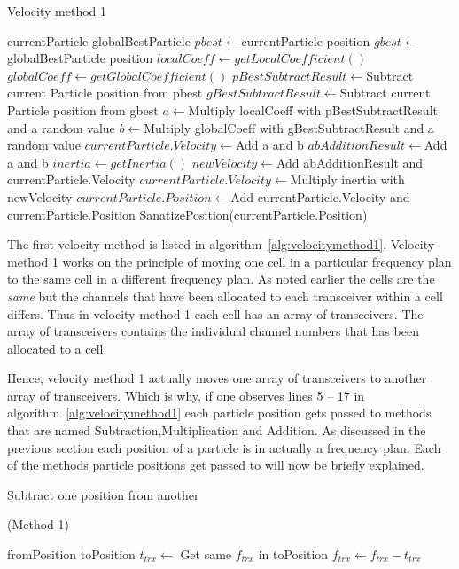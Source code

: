 \begin{algorithm}
\caption{Velocity method 1}
\label{alg:velocitymethod1}
	\begin{algorithmic}[1]
	\REQUIRE currentParticle
	\REQUIRE globalBestParticle
	\STATE $pbest \leftarrow $currentParticle position
	\STATE $gbest \leftarrow $globalBestParticle position
	\STATE $localCoeff \leftarrow getLocalCoefficient()$
	\STATE $globalCoeff \leftarrow getGlobalCoefficient()$
	\STATE $pBestSubtractResult \leftarrow $Subtract current Particle position from pbest
	\STATE $gBestSubtractResult \leftarrow $Subtract current Particle position from gbest
	\STATE $a \leftarrow $Multiply localCoeff with pBestSubtractResult and a random value
	\STATE $b \leftarrow $Multiply globalCoeff with gBestSubtractResult and a random value
		\STATE $currentParticle.Velocity \leftarrow $Add a and b
	\ELSE
		\STATE $abAdditionResult \leftarrow $Add a and b
		\STATE $inertia \leftarrow getInertia()$
		\STATE $newVelocity \leftarrow $Add abAdditionResult and currentParticle.Velocity
		\STATE $currentParticle.Velocity \leftarrow $Multiply inertia with newVelocity
	\ENDIF
	\STATE $currentParticle.Position \leftarrow $Add currentParticle.Velocity and currentParticle.Position
	\STATE SanatizePosition(currentParticle.Position)
	\end{algorithmic}
\end{algorithm}

The first velocity method is listed in algorithm~\ref{alg:velocitymethod1}. Velocity method 1 works on the principle of moving one cell in a particular frequency plan to the same cell in a different frequency plan. As noted earlier the cells are the \emph{same} but the channels that have been allocated to each transceiver within a cell differs. Thus in velocity method 1 each cell has an array of transceivers. The array of transceivers contains the individual channel numbers that has been allocated to a cell.

Hence, velocity method 1 actually moves one array of transceivers to another array of transceivers. Which is why, if one observes lines 5 -- 17 in algorithm~\ref{alg:velocitymethod1} each particle position gets passed to methods that are named Subtraction,Multiplication and Addition. As discussed in the previous section each position of a particle is in actually a frequency plan. Each of the methods particle positions get passed to will now be briefly explained.

\begin{algorithm}
\caption{Subtract one position from another} (Method 1)
\label{alg:arraySubtract}
\begin{algorithmic}[1]
	\REQUIRE fromPosition
	\REQUIRE toPosition
			\STATE $t_{trx} \leftarrow$ Get same $f_{trx}$ in toPosition
			\STATE $f_{trx} \leftarrow f_{trx} - t_{trx}$
		\ENDFOR
	\ENDFOR
\end{algorithmic}
\end{algorithm}

